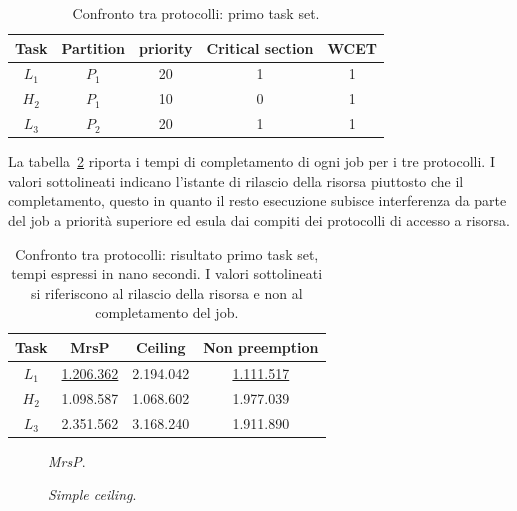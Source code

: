 \begin{table}
  \centering
  \begin{tabular}{ccccc}
	\hline\hline
	    Task & Partition & priority & Critical section & WCET  \\ \hline
	    $L_1$ & $P_1$  & 20 & 1 & 1 \\
	    $H_2$ & $P_1$  & 10 & 0 & 1 \\
    	$L_3$ & $P_2$  & 20 & 1 & 1 \\
  	\hline
  	\end{tabular}
  \caption{Confronto tra protocolli: primo task set.}
  \label{tab:test_protocols_Taskset1}
\end{table}

La tabella~\ref{tab:test_protocols_Taskset1_ris} riporta i tempi di completamento di ogni job per i tre protocolli. I valori sottolineati indicano l'istante di rilascio della risorsa piuttosto che il completamento, questo in quanto il resto esecuzione subisce interferenza da parte del job a priorità superiore ed esula dai compiti dei protocolli di accesso a risorsa.\\

\begin{table}
  \centering
  \begin{tabular}{cccc}
  \hline\hline
    Task & MrsP & Ceiling & Non preemption \\ \hline
    $L_1$ & \underline{1.206.362} & 2.194.042 & \underline{1.111.517} \\
    $H_2$ & 1.098.587 & 1.068.602 & 1.977.039 \\
    $L_3$ & 2.351.562 & 3.168.240 & 1.911.890 \\
    \hline
    \end{tabular}
  \caption{Confronto tra protocolli: risultato primo task set, tempi espressi in nano secondi. I valori sottolineati si riferiscono al rilascio della risorsa e non al completamento del job.}
  \label{tab:test_protocols_Taskset1_ris}
\end{table}

    \begin{figure}
      \centering
      \RisultatoUnoMrsP
      \caption{\textit{MrsP}.}
      \label{fig:test_protocols_mrsp}
    \end{figure}

    \begin{figure}
      \centering
      \RisultatoUnoCeiling
      \caption{\textit{Simple ceiling}.}
      \label{fig:test_protocols_sc}
    \end{figure}
    
